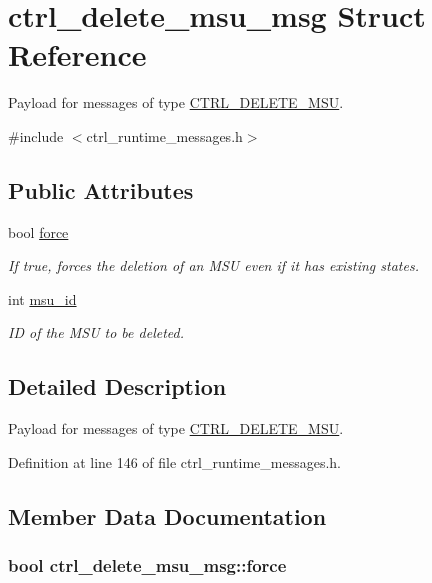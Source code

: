\hypertarget{structctrl__delete__msu__msg}{\section{ctrl\-\_\-delete\-\_\-msu\-\_\-msg Struct Reference}
\label{structctrl__delete__msu__msg}
}


Payload for messages of type \hyperlink{ctrl__runtime__messages_8h_aff250b7918a6975b13277c84bc6ec5b9abb237dc0ea60528dd97f4aab37fc9723}{C\-T\-R\-L\-\_\-\-D\-E\-L\-E\-T\-E\-\_\-\-M\-S\-U}.  




{\ttfamily \#include $<$ctrl\-\_\-runtime\-\_\-messages.\-h$>$}

\subsection*{Public Attributes}
\begin{DoxyCompactItemize}
\item 
bool \hyperlink{structctrl__delete__msu__msg_aee24e0a08448f45d22f4565a7dc7dfde}{force}
\begin{DoxyCompactList}\small\item\em If {\ttfamily true}, forces the deletion of an M\-S\-U even if it has existing states. \end{DoxyCompactList}\item 
int \hyperlink{structctrl__delete__msu__msg_a1ae44491d0840269eeec01757753fcb6}{msu\-\_\-id}
\begin{DoxyCompactList}\small\item\em I\-D of the M\-S\-U to be deleted. \end{DoxyCompactList}\end{DoxyCompactItemize}


\subsection{Detailed Description}
Payload for messages of type \hyperlink{ctrl__runtime__messages_8h_aff250b7918a6975b13277c84bc6ec5b9abb237dc0ea60528dd97f4aab37fc9723}{C\-T\-R\-L\-\_\-\-D\-E\-L\-E\-T\-E\-\_\-\-M\-S\-U}. 

Definition at line 146 of file ctrl\-\_\-runtime\-\_\-messages.\-h.



\subsection{Member Data Documentation}
\hypertarget{structctrl__delete__msu__msg_aee24e0a08448f45d22f4565a7dc7dfde}{
\subsubsection[{force}]{\setlength{\rightskip}{0pt plus 5cm}bool ctrl\-\_\-delete\-\_\-msu\-\_\-msg\-::force}}\label{structctrl__delete__msu__msg_aee24e0a08448f45d22f4565a7dc7dfde}


